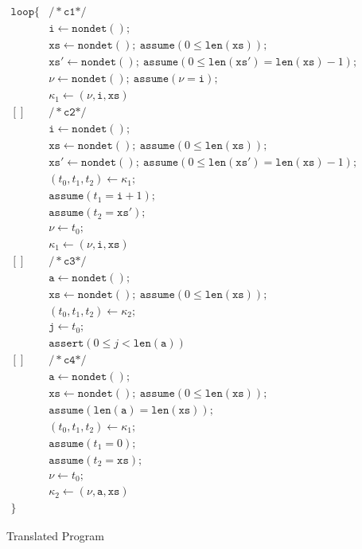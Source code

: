\documentclass[nocopyrightspace]{sigplanconf}
\newcommand{\ttxs}{\mathtt{xs}}
\newcommand{\ttxsp}{\mathtt{xs'}}
\newcommand{\tta}{\mathtt{a}}
\newcommand{\tti}{\mathtt{i}}
\newcommand{\ttj}{\mathtt{j}}
\def\ttxs{\mathtt{xs}}
\def\valu{\nu}
\newcommand{\ASSERT}[2]{\{{#1}\}\ {#2}}
\newcommand{\kvar}{\kappa}
\newcommand{\ttlen}{\mathtt{len}}
\def\NONDET{\mathtt{nondet}}
\newcommand{\ASSIGN}[2]{{#1} \leftarrow {#2}}
\newcommand{\TASSIGN}[2]{{#1} \leftarrow {#2}}
\newcommand{\HAVOC}[1]{\ASSIGN{#1}{\NONDET()}}
\def\ASSUME{{{\mathtt{assume}}}}
\def\ASSERT{{{\mathtt{assert}}}}
\newcommand{\GET}[2]{\TASSIGN{#2}{#1}}
\newcommand{\SET}[2]{\TASSIGN{#1}{#2}}
\def\LOOP{{{\mathtt{loop}}}}
\def\rkvar{{\kvar}}
\def\CHOICE{{\mathrm{[\!] }}}
\begin{document}
\begin{figure}[t]
\begin{small}
\[
\begin{array}{rl}
\LOOP\{ & \mathtt{{/*} c1 {*/}} \\
	& \HAVOC{\tti};\\
        & \HAVOC{\ttxs};\ \ASSUME(0 \leq \ttlen(\ttxs));\\
	& \HAVOC{\ttxsp};\ \ASSUME(0 \leq \ttlen(\ttxsp) = \ttlen(\ttxs)-1);\\
	& \HAVOC{\valu};\ \ASSUME(\valu = \tti);\\
	& \SET{\rkvar_1}{(\valu,\tti,\ttxs)}\\[4pt]
\CHOICE & \mathtt{{/*} c2 {*/}} \\
	& \HAVOC{\tti};\\
        & \HAVOC{\ttxs};\ \ASSUME(0 \leq \ttlen(\ttxs));\\
	& \HAVOC{\ttxsp};\ \ASSUME(0 \leq \ttlen(\ttxsp) = \ttlen(\ttxs)-1);\\
	& \GET{\rkvar_1}{(t_0,t_1,t_2)}; \\
	& \ASSUME(t_1 = \tti +1);\\
	& \ASSUME(t_2 = \ttxsp);\\
	& \ASSIGN{\valu}{t_0};\\
	& \SET{\rkvar_1}{(\valu, \tti, \ttxs)}\\[4pt]
\CHOICE & \mathtt{{/*} c3 {*/}}\\
	& \HAVOC{\tta};\\
        & \HAVOC{\ttxs};\ \ASSUME(0 \leq \ttlen(\ttxs));\\
  	& \GET{\rkvar_2}{(t_0, t_1, t_2)};\\ 
  	& \ASSIGN{\ttj}{t_0};\\
	& \ASSERT(0 \leq j < \ttlen(\tta))\\[4pt]
\CHOICE & \mathtt{{/*} c4 {*/}}\\
	& \HAVOC{\tta};\\
        & \HAVOC{\ttxs};\ \ASSUME(0 \leq \ttlen(\ttxs));\\
	& \ASSUME(\ttlen(\tta) = \ttlen(\ttxs)); \\
	& \GET{\rkvar_1}{(t_0, t_1, t_2)};\\
	& \ASSUME(t_1 = 0);\\
	& \ASSUME(t_2 = \ttxs);\\
	& \ASSIGN{\valu}{t_0};\\
	& \SET{\rkvar_2}{(\valu, \tta, \ttxs)} \\
\}	&
\end{array}
\]
\end{small}
\caption{Translated Program}
\label{ex-ml-imperative}
\end{figure}
\end{document}
